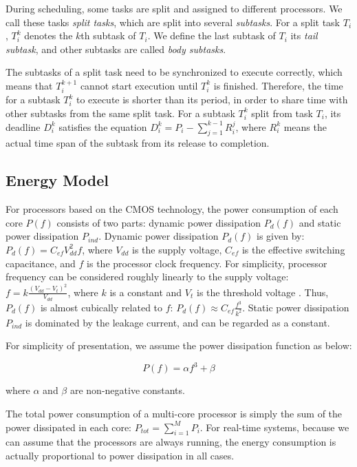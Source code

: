 \documentclass[12pt, journal,compsoc]{IEEEtran}
\begin{document}
During scheduling, some tasks are split and assigned to different processors. We call these tasks \emph{split tasks}, which are split into several \emph{subtasks}. For a split task $T_i$, $T_i^k$ denotes the $k$th subtask of $T_i$. We define the last subtask of $T_i$ its \emph{tail subtask}, and other subtasks are called \emph{body subtasks}.

The subtasks of a split task need to be synchronized to execute correctly, which means that $T_i^{k+1}$ cannot start execution until $T_i^k$ is finished. Therefore, the time for a subtask $T_i^{k}$ to execute is shorter than its period, in order to share time with other subtasks from the same split task. For a subtask $T_i^k$ split from task $T_i$, its deadline $D_i^k$ satisfies the equation $D_i^k = P_i - \sum\limits_{j = 1}^{k - 1}R_i^j$, where $R_i^k$ means the actual time span of the subtask from its release to completion.

\subsection{Energy Model}
For processors based on the CMOS technology, the power consumption of each core $P(f)$ consists of two parts: dynamic power dissipation $P_d(f)$ and static power dissipation $P_{ind}$. Dynamic power dissipation $P_d(f)$ is given by: $P_d(f) = C_{ef} V_{dd}^2 f$, where $V_{dd}$ is the supply voltage, $C_{ef}$ is the effective switching capacitance, and $f$ is the processor clock frequency. For simplicity, processor frequency can be considered roughly linearly to the supply voltage: $f = k \frac{(V_{dd}-V_t)^2}{V_{dd}}$, where $k$ is a constant and $V_t$ is the threshold voltage \cite{Chandrakasan95lowpower}. Thus, $P_d(f)$ is almost cubically related to $f$: $P_d(f) \approx C_{ef} \frac{f^3}{k^2}$. Static power dissipation $P_{ind}$ is dominated by the leakage current, and can be regarded as a constant.


For simplicity of presentation, we assume the power dissipation function as below:

\begin{equation}
\label{Pafb}
P(f) = \alpha {f^3} + \beta
\end{equation}

where $\alpha$ and $\beta$ are non-negative constants.

The total power consumption of a multi-core processor is simply the sum of the power dissipated in each core: $P_{tot} = \sum\limits_{i=1}^M P_i$. For real-time systems, because we can assume that the processors are always running, the energy consumption is actually proportional to power dissipation in all cases.
\end{document}

